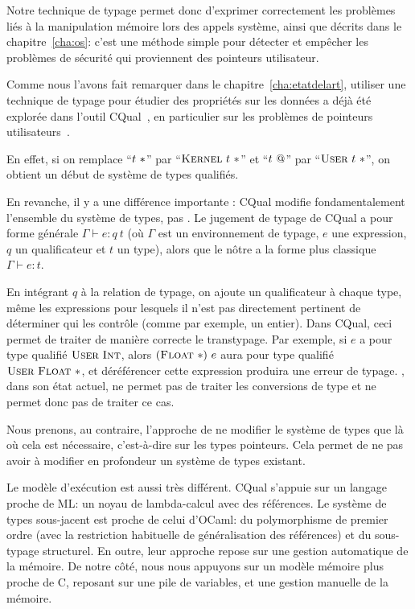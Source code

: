 Notre technique de typage permet donc d'exprimer correctement les problèmes liés
à la manipulation mémoire lors des appels système, ainsi que décrits dans le
chapitre~\ref{cha:os}: c'est une méthode simple pour détecter et empêcher les
problèmes de sécurité qui proviennent des pointeurs utilisateur.

Comme nous l'avons fait remarquer dans le chapitre~\ref{cha:etatdelart},
utiliser une technique de typage pour étudier des propriétés sur les données a
déjà été explorée dans l'outil CQual~\cite{pldi99}, en particulier sur les
problèmes de pointeurs utilisateurs~\cite{cquk-usenix04}.

En effet, si on remplace \enquote{$t~*$} par \enquote{$\textsc{Kernel}~t~*$} et
\enquote{$t~@$} par \enquote{$\textsc{User}~t~*$}, on obtient un début de système
de types qualifiés.

En revanche, il y a une différence importante : CQual modifie fondamentalement
l'ensemble du système de types, pas \langname. Le jugement de typage de CQual a
pour forme générale $Γ ⊢ e : q~t$ (où $Γ$ est un environnement de typage, $e$
une expression, $q$ un qualificateur et $t$ un type), alors que le nôtre a la
forme plus classique $Γ ⊢ e : t$.

En intégrant $q$ à la relation de typage, on ajoute un qualificateur à chaque
type, même les expressions pour lesquels il n'est pas directement pertinent de
déterminer qui les contrôle (comme par exemple, un entier). Dans CQual, ceci
permet de traiter de manière correcte le transtypage. Par exemple, si $e$ a pour
type qualifié $\textsc{User}~\textsc{Int}$, alors $(\textsc{Float}~*)~e$ aura pour type qualifié
$\textsc{User}~\textsc{Float}~*$, et déréférencer cette expression produira une erreur de
typage. \langname, dans son état actuel, ne permet pas de traiter les
conversions de type et ne permet donc pas de traiter ce cas.

Nous prenons, au contraire, l'approche de ne modifier le système de types que là
où cela est nécessaire, c'est-à-dire sur les types pointeurs. Cela permet de ne
pas avoir à modifier en profondeur un système de types existant.

Le modèle d'exécution est aussi très différent. CQual s'appuie sur un
langage proche de ML: un noyau de lambda-calcul avec des références. Le système
de types sous-jacent est proche de celui d'OCaml: du polymorphisme de premier
ordre (avec la restriction habituelle de généralisation des références) et du
sous-typage structurel. En outre, leur approche repose sur une gestion
automatique de la mémoire. De notre côté, nous nous appuyons sur un modèle
mémoire plus proche de C, reposant sur une pile de variables, et une gestion
manuelle de la mémoire.

